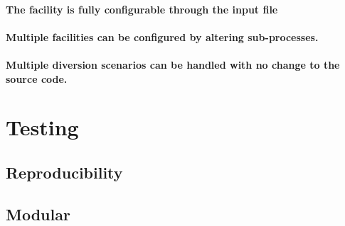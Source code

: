 \paragraph{The facility is fully configurable through the input file}

\paragraph{Multiple facilities can be configured by altering sub-processes.}

\paragraph{Multiple diversion scenarios can be handled with no change to the source code.}


\section{Testing}

\subsection{Reproducibility}

\subsection{Modular}